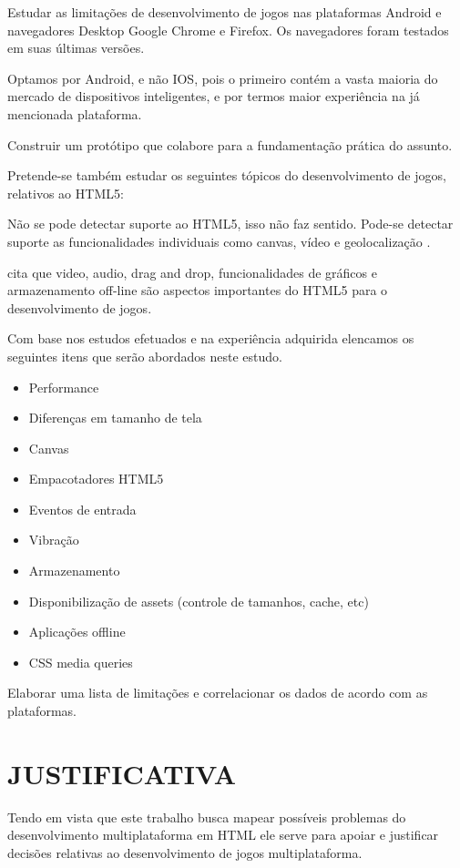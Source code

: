\documentclass[
12pt,
a4paper,
portuges,
draft
]{report}
\begin{document}
Estudar as limitações de desenvolvimento de jogos nas plataformas
Android e navegadores Desktop Google Chrome
e Firefox. Os navegadores foram testados em suas últimas versões.

Optamos por Android, e não IOS, pois o primeiro contém
a vasta maioria do mercado de dispositivos inteligentes, e por termos
maior experiência na já mencionada plataforma.

Construir um protótipo que colabore para a fundamentação prática do assunto.

Pretende-se também estudar os seguintes tópicos do desenvolvimento de
jogos, relativos ao HTML5:

Não se pode detectar suporte ao HTML5, isso não faz sentido. Pode-se detectar suporte as funcionalidades individuais como canvas, vídeo e geolocalização \autocite{diveIntohtml}.

\cite{browserGamesTechnologyAndFuture} cita que video, audio, drag
and drop, funcionalidades de gráficos e armazenamento off-line são
aspectos importantes do HTML5 para o desenvolvimento de jogos.

Com base nos estudos efetuados e na experiência adquirida elencamos os
seguintes itens que serão abordados neste estudo.

\begin{itemize}
\item Performance
\item Diferenças em tamanho de tela
\item Canvas
\item Empacotadores HTML5
\item Eventos de entrada
\item Vibração
\item Armazenamento
\item Disponibilização de assets (controle de tamanhos, cache, etc)
\item Aplicações offline
\item CSS media queries
\end{itemize}

Elaborar uma lista de limitações e correlacionar os dados de acordo
com as plataformas.


\chapter{JUSTIFICATIVA}

Tendo em vista que este trabalho busca mapear possíveis problemas
do desenvolvimento multiplataforma em HTML ele serve para apoiar
e justificar decisões relativas ao desenvolvimento de jogos
multiplataforma.
\end{document}

